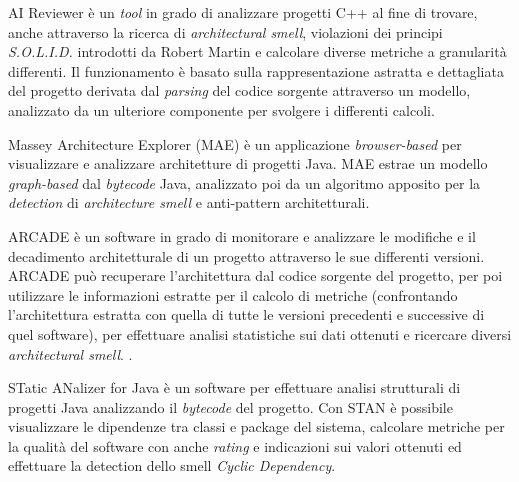     AI Reviewer \cite{AIReviewer} è un \textit{tool} in grado di analizzare progetti C++ al fine di trovare, anche attraverso la ricerca di \textit{architectural smell}, violazioni dei principi \textit{S.O.L.I.D.} introdotti da Robert Martin \cite{martin2002agile} e calcolare diverse metriche a granularità differenti. Il funzionamento è basato sulla rappresentazione astratta e dettagliata del progetto derivata dal \textit{parsing} del codice sorgente attraverso un modello, analizzato da un ulteriore componente per svolgere i differenti calcoli.

    Massey Architecture Explorer (MAE) \cite{MasseyArchitectureExplorer} è un applicazione \textit{browser-based} per visualizzare e analizzare architetture di progetti Java. MAE estrae un modello \textit{graph-based} dal \textit{bytecode} Java, analizzato poi da un algoritmo apposito per la \textit{detection} di \textit{architecture smell} e anti-pattern architetturali.


    ARCADE \cite{Arcade7180083} è un software in grado di monitorare e analizzare le modifiche e il decadimento architetturale di un progetto attraverso le sue differenti versioni. 
    ARCADE può recuperare l'architettura dal codice sorgente del progetto, per poi utilizzare le informazioni estratte per il calcolo di metriche (confrontando l'architettura estratta con quella di tutte le versioni precedenti e successive di quel software), per effettuare analisi statistiche sui dati ottenuti e ricercare diversi \textit{architectural smell}. \cite{AzadiFontana}. 


    STatic ANalizer for Java \cite{STAN} è un software per effettuare analisi strutturali di progetti Java analizzando il \textit{bytecode} del progetto. Con STAN è possibile visualizzare le dipendenze tra classi e package del sistema, calcolare metriche per la qualità del software con anche \textit{rating} e indicazioni sui valori ottenuti ed effettuare la detection dello smell \textit{Cyclic Dependency}.
    

